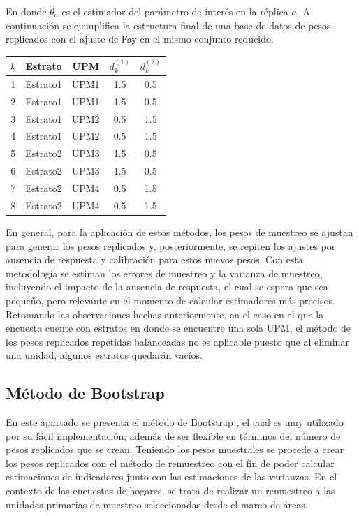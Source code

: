 \documentclass[
  12pt,
]{book}
\begin{document}
En donde \(\hat{\theta}_a\) es el estimador del parámetro de interés en la réplica \(a\). A continuación se ejemplifica la estructura final de una base de datos de pesos replicados con el ajuste de Fay en el mismo conjunto reducido.

\begin{longtable}[]{@{}ccccc@{}}
\toprule()
\(k\) & Estrato & UPM & \(d_k^{(1)}\) & \(d_k^{(2)}\) \\
\midrule()
\endhead
1 & Estrato1 & UPM1 & 1.5 & 0.5 \\
2 & Estrato1 & UPM1 & 1.5 & 0.5 \\
3 & Estrato1 & UPM2 & 0.5 & 1.5 \\
4 & Estrato1 & UPM2 & 0.5 & 1.5 \\
5 & Estrato2 & UPM3 & 1.5 & 0.5 \\
6 & Estrato2 & UPM3 & 1.5 & 0.5 \\
7 & Estrato2 & UPM4 & 0.5 & 1.5 \\
8 & Estrato2 & UPM4 & 0.5 & 1.5 \\
\bottomrule()
\end{longtable}

En general, para la aplicación de estos métodos, los pesos de muestreo se ajustan para generar los pesos replicados y, posteriormente, se repiten los ajustes por ausencia de respuesta y calibración para estos nuevos pesos. Con esta metodología se estiman los errores de muestreo y la varianza de muestreo, incluyendo el impacto de la ausencia de respuesta, el cual se espera que sea pequeño, pero relevante en el momento de calcular estimadores más precisos. Retomando las observaciones hechas anteriormente, en el caso en el que la encuesta cuente con estratos en donde se encuentre una sola UPM, el método de los pesos replicados repetidas balanceadas no es aplicable puesto que al eliminar una unidad, algunos estratos quedarán vacíos.

\hypertarget{muxe9todo-de-bootstrap}{%
\subsection{Método de Bootstrap}\label{muxe9todo-de-bootstrap}}

En este apartado se presenta el método de Bootstrap \citep{EfroTibs93}, el cual es muy utilizado por su fácil implementación; además de ser flexible en términos del número de pesos replicados que se crean. Teniendo los pesos muestrales se procede a crear los pesos replicados con el método de remuestreo con el fin de poder calcular estimaciones de indicadores junto con las estimaciones de las varianzas. En el contexto de las encuestas de hogares, se trata de realizar un remuestreo a las unidades primarias de muestreo seleccionadas desde el marco de áreas.
\end{document}
